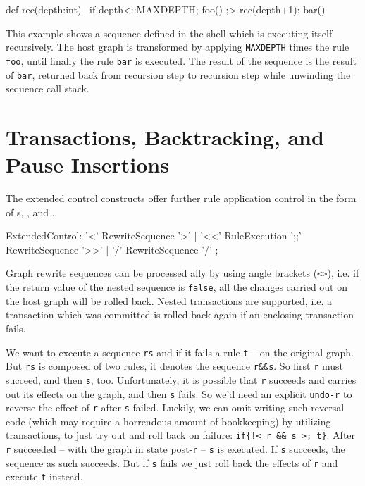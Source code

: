 \begin{example}
\label{ex:recseq}
\begin{grgen}
def rec(depth:int) {\
  if{ {{depth<::MAXDEPTH}}; foo() ;> rec(depth+1); bar() }\
}
\end{grgen}
This example shows a sequence defined in the shell which is executing itself recursively.
The host graph is transformed by applying \texttt{MAXDEPTH} times the rule \texttt{foo}, until finally the rule \texttt{bar} is executed. The result of the sequence is the result of \texttt{bar}, returned back from recursion step to recursion step while unwinding the sequence call stack. 
\end{example}


\section{Transactions, Backtracking, and Pause Insertions}\label{sec:extctrl}

The extended control constructs offer further rule application control in the form of s, , and .

\begin{rail} 
  ExtendedControl: 
    '<' RewriteSequence '>' | 
    '<<' RuleExecution ';;' RewriteSequence '>>' |
    '/' RewriteSequence '/'
	;
\end{rail}

Graph rewrite sequences can be processed ally by using angle brackets (\texttt{<>}), i.e.
if the return value of the nested sequence is \texttt{false}, all the changes carried out on the host graph will be rolled back.
Nested transactions\indexmainsee{nested transaction}{transaction} are supported, i.e. a transaction which was committed is rolled back again if an enclosing transaction fails.

\begin{example}
We want to execute a sequence \texttt{rs} and if it fails a rule \texttt{t} -- on the original graph. But \texttt{rs} is composed of two rules, it denotes the sequence \verb#r&&s#. So first \texttt{r} must succeed, and then \texttt{s}, too. Unfortunately, it is possible that \texttt{r} succeeds and carries out its effects on the graph, and then \texttt{s} fails. So we'd need an explicit \texttt{undo-r} to reverse the effect of \texttt{r} after \texttt{s} failed. Luckily, we can omit writing such reversal code (which may require a horrendous amount of bookkeeping) by utilizing transactions, to just try out and roll back on failure: \verb#if{!< r && s >; t}#. After \texttt{r} succeeded -- with the graph in state post-\texttt{r} -- \texttt{s} is executed. If \texttt{s} succeeds, the sequence as such succeeds. But if \texttt{s} fails we just roll back the effects of \texttt{r} and execute \texttt{t} instead. 
\end{example}

